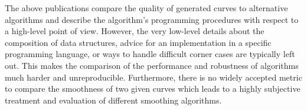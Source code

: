 \documentclass{stdlocal}
\begin{document}
The above publications compare the quality of generated curves to alternative algorithms and describe the algorithm's programming procedures with respect to a high-level point of view.
However, the very low-level details about the composition of data structures, advice for an implementation in a specific programming language, or ways to handle difficult corner cases are typically left out.
This makes the comparison of the performance and robustness of algorithms much harder and unreproducible.
Furthermore, there is no widely accepted metric to compare the smoothness of two given curves which leads to a highly subjective treatment and evaluation of different smoothing algorithms.

\end{document}
